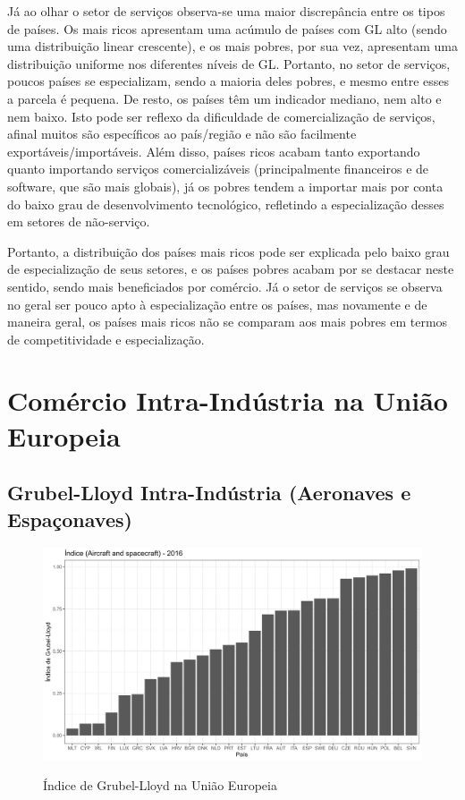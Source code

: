 Já ao olhar o setor de serviços observa-se uma maior discrepância entre os tipos de países. Os mais ricos apresentam uma acúmulo de países com GL alto (sendo uma distribuição linear crescente), e os mais pobres, por sua vez, apresentam uma distribuição uniforme nos diferentes níveis de GL. Portanto, no setor de serviços, poucos países se especializam, sendo a maioria deles pobres, e mesmo entre esses a parcela é pequena. De resto, os países têm um indicador mediano, nem alto e nem baixo. Isto pode ser reflexo da dificuldade de comercialização de serviços, afinal muitos são específicos ao país/região e não são facilmente exportáveis/importáveis. Além disso, países ricos acabam tanto exportando quanto importando serviços comercializáveis (principalmente financeiros e de software, que são mais globais), já os pobres tendem a importar mais por conta do baixo grau de desenvolvimento tecnológico, refletindo a especialização desses em setores de não-serviço.

Portanto, a distribuição dos países mais ricos pode ser explicada pelo baixo grau de especialização de seus setores, e os países pobres acabam por se destacar neste sentido, sendo mais beneficiados por comércio. Já o setor de serviços se observa no geral ser pouco apto à especialização entre os países, mas novamente e de maneira geral, os países mais ricos não se comparam aos mais pobres em termos de competitividade e especialização.

\clearpage
\section{Comércio Intra-Indústria na União Europeia}
\setcounter{subsection}{1}

\subsection{Grubel-Lloyd Intra-Indústria (Aeronaves e Espaçonaves)}

\begin{figure}[!h]
    \centering
    \caption{Índice de Grubel-Lloyd na União Europeia}
    \includegraphics*[width = 0.8\linewidth]{../plots/gl_eu.png}
    \label{fig:gl-ue}
\end{figure}

